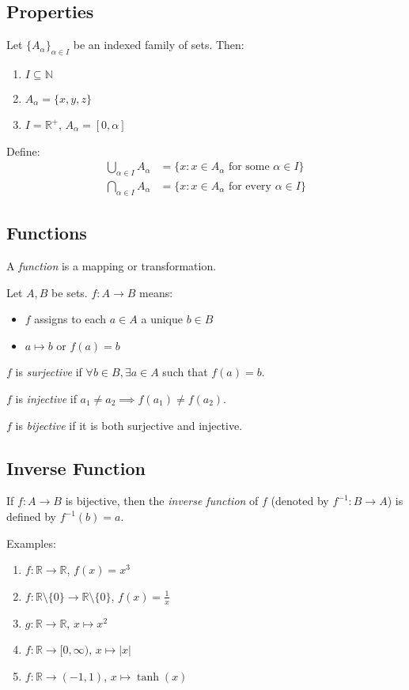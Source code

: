 \documentclass[12pt,a4paper]{article}
\begin{document}
\subsection{Properties}

Let $\{A_\alpha\}_{\alpha \in I}$ be an indexed family of sets. Then:

\begin{enumerate}
    \item $I \subseteq \mathbb{N}$
    \item $A_\alpha = \{x,y,z\}$
    \item $I = \mathbb{R}^+$, $A_\alpha = [0,\alpha]$
\end{enumerate}

Define:
\begin{align*}
    \bigcup_{\alpha \in I} A_\alpha &= \{x : x \in A_\alpha \text{ for some } \alpha \in I\} \\
    \bigcap_{\alpha \in I} A_\alpha &= \{x : x \in A_\alpha \text{ for every } \alpha \in I\}
\end{align*}

\subsection{Functions}

A \textit{function} is a mapping or transformation.

Let $A, B$ be sets. $f:A \to B$ means:
\begin{itemize}
    \item $f$ assigns to each $a \in A$ a unique $b \in B$
    \item $a \mapsto b$ or $f(a) = b$
\end{itemize}

$f$ is \textit{surjective} if $\forall b \in B, \exists a \in A$ such that $f(a) = b$.

$f$ is \textit{injective} if $a_1 \neq a_2 \implies f(a_1) \neq f(a_2)$.

$f$ is \textit{bijective} if it is both surjective and injective.

\subsection{Inverse Function}

If $f : A \to B$ is bijective, then the \textit{inverse function} of $f$ (denoted by $f^{-1} : B \to A$) is defined by $f^{-1}(b) = a$.

Examples:
\begin{enumerate}
    \item $f : \mathbb{R} \to \mathbb{R}$, $f(x) = x^3$
    \item $f : \mathbb{R} \setminus \{0\} \to \mathbb{R} \setminus \{0\}$, $f(x) = \frac{1}{x}$
    \item $g : \mathbb{R} \to \mathbb{R}$, $x \mapsto x^2$
    \item $f : \mathbb{R} \to [0,\infty)$, $x \mapsto |x|$
    \item $f : \mathbb{R} \to (-1,1)$, $x \mapsto \tanh(x)$
\end{enumerate}
\end{document}
